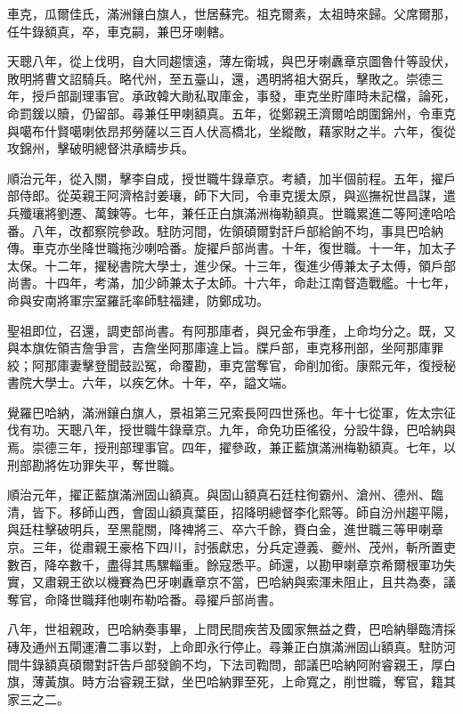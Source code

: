 \begin{pinyinscope}
車克，瓜爾佳氏，滿洲鑲白旗人，世居蘇完。祖克爾素，太祖時來歸。父席爾那，任牛錄額真，卒，車克嗣，兼巴牙喇轄。

天聰八年，從上伐明，自大同趨懷遠，薄左衛城，與巴牙喇纛章京圖魯什等設伏，敗明將曹文詔騎兵。略代州，至五臺山，還，遇明將祖大弼兵，擊敗之。崇德三年，授戶部副理事官。承政韓大勛私取庫金，事發，車克坐貯庫時未記檔，論死，命罰鍰以贖，仍留部。尋兼任甲喇額真。五年，從鄭親王濟爾哈朗圍錦州，令車克與噶布什賢噶喇依昂邦勞薩以三百人伏高橋北，坐縱敵，藉家財之半。六年，復從攻錦州，擊破明總督洪承疇步兵。

順治元年，從入關，擊李自成，授世職牛錄章京。考績，加半個前程。五年，擢戶部侍郎。從英親王阿濟格討姜瓖，師下大同，令車克援太原，與巡撫祝世昌謀，遣兵殲瓖將劉遷、萬鍊等。七年，兼任正白旗滿洲梅勒額真。世職累進二等阿達哈哈番。八年，改都察院參政。駐防河間，佐領碩爾對訐戶部給餉不均，事具巴哈納傳。車克亦坐降世職拖沙喇哈番。旋擢戶部尚書。十年，復世職。十一年，加太子太保。十二年，擢秘書院大學士，進少保。十三年，復進少傅兼太子太傅，領戶部尚書。十四年，考滿，加少師兼太子太師。十六年，命赴江南督造戰艦。十七年，命與安南將軍宗室羅託率師駐福建，防鄭成功。

聖祖即位，召還，調吏部尚書。有阿那庫者，與兄金布爭產，上命均分之。既，又與本旗佐領吉詹爭言，吉詹坐阿那庫違上旨。牒戶部，車克移刑部，坐阿那庫罪絞；阿那庫妻擊登聞鼓訟冤，命覆勘，車克當奪官，命削加銜。康熙元年，復授秘書院大學士。六年，以疾乞休。十年，卒，謚文端。

覺羅巴哈納，滿洲鑲白旗人，景祖第三兄索長阿四世孫也。年十七從軍，佐太宗征伐有功。天聰八年，授世職牛錄章京。九年，命免功臣徭役，分設牛錄，巴哈納與焉。崇德三年，授刑部理事官。四年，擢參政，兼正藍旗滿洲梅勒額真。七年，以刑部勘將佐功罪失平，奪世職。

順治元年，擢正藍旗滿洲固山額真。與固山額真石廷柱徇霸州、滄州、德州、臨清，皆下。移師山西，會固山額真葉臣，招降明總督李化熙等。師自汾州趨平陽，與廷柱擊破明兵，至黑龍關，降裨將三、卒六千餘，賚白金，進世職三等甲喇章京。三年，從肅親王豪格下四川，討張獻忠，分兵定遵義、夔州、茂州，斬所置吏數百，降卒數千，盡得其馬騾輜重。餘寇悉平。師還，以勘甲喇章京希爾根軍功失實，又肅親王欲以機賽為巴牙喇纛章京不當，巴哈納與索渾未阻止，且共為奏，議奪官，命降世職拜他喇布勒哈番。尋擢戶部尚書。

八年，世祖親政，巴哈納奏事畢，上問民間疾苦及國家無益之費，巴哈納舉臨清採磚及通州五閘運漕二事以對，上命即永行停止。尋兼正白旗滿洲固山額真。駐防河間牛錄額真碩爾對訐告戶部發餉不均，下法司鞫問，部議巴哈納阿附睿親王，厚白旗，薄黃旗。時方治睿親王獄，坐巴哈納罪至死，上命寬之，削世職，奪官，籍其家三之二。


\end{pinyinscope}
